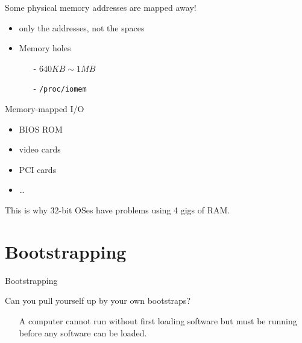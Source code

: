 \begin{frame}[plain]
  \begin{minipage}{.65\linewidth}
    \begin{block}{Some physical memory addresses are mapped away!}
      \begin{itemize}
      \item only the addresses, not the spaces
      \item Memory holes
        \begin{itemize}
        \item[-] $640KB \sim 1MB$
        \item[-] \texttt{/proc/iomem}
        \end{itemize}
      \end{itemize}
    \end{block}
    \begin{block}{Memory-mapped I/O}
      \begin{itemize}
      \item BIOS ROM
      \item video cards
      \item PCI cards
      \item \ldots
      \end{itemize}
      This is why 32-bit OSes have problems using 4 gigs of RAM.
    \end{block}
  \end{minipage}\quad
  \begin{minipage}{.3\linewidth}
  \end{minipage}
\end{frame}

\section{Bootstrapping}
\label{sec:bootstrapping}

\begin{frame}{Bootstrapping}
  \begin{block}{Can you pull yourself up by your own bootstraps?}
    \begin{itemize}
    \item[] A computer cannot run without first loading software but must be running
      before any software can be loaded.
    \end{itemize}
  \end{block}
  \begin{center}
  \end{center}
\end{frame}

